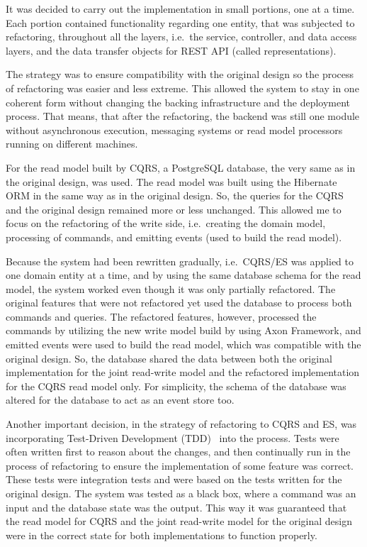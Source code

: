 \documentclass{book}
\begin{document}
It was decided to carry out the implementation in small portions, one at
a time. Each portion contained functionality regarding one entity, that
was subjected to refactoring, throughout all the layers, i.e.~the
service, controller, and data access layers, and the data transfer
objects for REST API (called representations).

The strategy was to ensure compatibility with the original design so the
process of refactoring was easier and less extreme. This allowed the
system to stay in one coherent form without changing the backing
infrastructure and the deployment process. That means, that after the
refactoring, the backend was still one module without asynchronous
execution, messaging systems or read model processors running on
different machines.

For the read model built by CQRS, a PostgreSQL database, the very same
as in the original design, was used. The read model was built using the
Hibernate ORM in the same way as in the original design. So, the queries
for the CQRS and the original design remained more or less unchanged.
This allowed me to focus on the refactoring of the write side,
i.e.~creating the domain model, processing of commands, and emitting
events (used to build the read model).

Because the system had been rewritten gradually, i.e.~CQRS/ES was
applied to one domain entity at a time, and by using the same database
schema for the read model, the system worked even though it was only
partially refactored. The original features that were not refactored yet
used the database to process both commands and queries. The refactored
features, however, processed the commands by utilizing the new write
model build by using Axon Framework, and emitted events were used to
build the read model, which was compatible with the original design. So,
the database shared the data between both the original implementation
for the joint read-write model and the refactored implementation for the
CQRS read model only. For simplicity, the schema of the database was
altered for the database to act as an event store too.

Another important decision, in the strategy of refactoring to CQRS and
ES, was incorporating Test-Driven Development (TDD)~\cite{tdd} into the
process. Tests were often written first to reason about the changes, and
then continually run in the process of refactoring to ensure the
implementation of some feature was correct. These tests were integration
tests and were based on the tests written for the original design. The
system was tested as a black box, where a command was an input and the
database state was the output. This way it was guaranteed that the read
model for CQRS and the joint read-write model for the original design
were in the correct state for both implementations to function properly.
\end{document}
